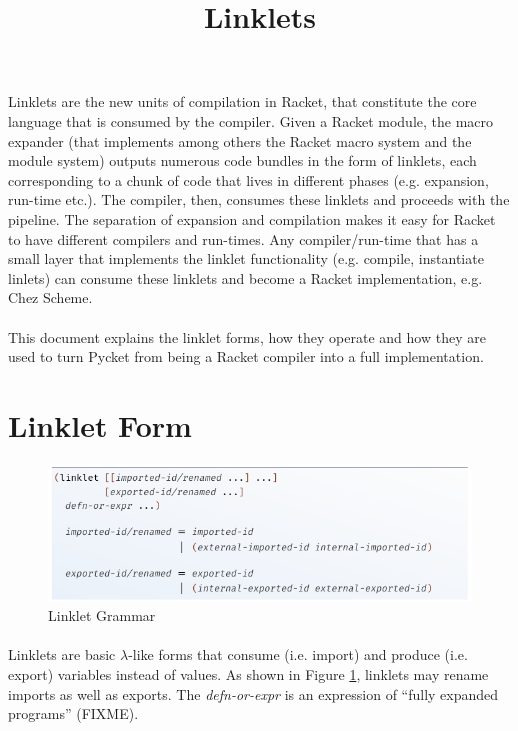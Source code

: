 \documentclass[a4paper]{article}
\title{Linklets}
\author{}
\date{}
\begin{document}
\maketitle

\paragraph{} Linklets are the new units of compilation in Racket, that
constitute the core language that is consumed by the compiler. Given a
Racket module, the macro expander (that implements among others the
Racket macro system and the module system) outputs numerous code
bundles in the form of linklets, each corresponding to a chunk of code
that lives in different phases (e.g. expansion, run-time etc.). The
compiler, then, consumes these linklets and proceeds with the
pipeline. The separation of expansion and compilation makes it easy
for Racket to have different compilers and run-times. Any
compiler/run-time that has a small layer that implements the linklet
functionality (e.g. compile, instantiate linlets) can consume these
linklets and become a Racket implementation, e.g. Chez Scheme.
\cite{racketcs-icfp-2019}

\paragraph{} This document explains the linklet forms, how they
operate and how they are used to turn Pycket from being a Racket
compiler into a full implementation.

\section{Linklet Form}

\begin{figure}[h!]
\includegraphics[scale=0.5]{img/linklet-grammar.png}
\caption{Linklet Grammar}
\label{fig:linklet-grammar}
\end{figure}

\paragraph{} Linklets are basic $\lambda$-like forms that consume
(i.e. import) and produce (i.e. export) variables instead of
values. As shown in Figure \ref{fig:linklet-grammar}, linklets may
rename imports as well as exports. The \emph{defn-or-expr} is an
expression of ``fully expanded programs'' (FIXME).
\end{document}
